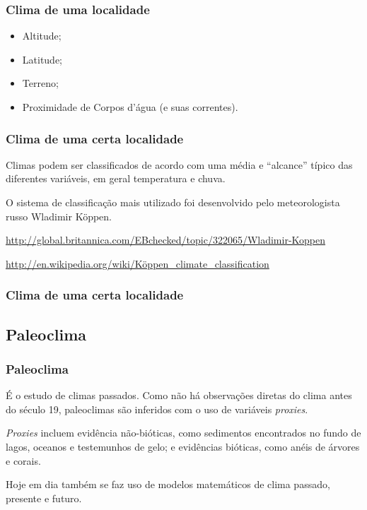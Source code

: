 \begin{frame}
\frametitle{Clima de uma localidade}
  \begin{itemize}[<+-| alert@+>]
    \item Altitude;
    \item Latitude;
    \item Terreno;
    \item Proximidade de Corpos d'água (e suas correntes).
  \end{itemize}
\end{frame}

\begin{frame}
\frametitle{Clima de uma certa localidade}
  \begin{block}{}
    Climas podem ser classificados de acordo com uma média e ``alcance'' típico
    das diferentes variáveis, em geral temperatura e chuva.
  \end{block}
\pause
  \begin{block}{}
    O sistema de classificação mais utilizado foi desenvolvido pelo
    meteorologista russo Wladimir Köppen.
  \end{block}
\pause
{\scriptsize
\url{http://global.britannica.com/EBchecked/topic/322065/Wladimir-Koppen}

\href{http://en.wikipedia.org/wiki/K\%C3\%B6ppen_climate_classification}{http://en.wikipedia.org/wiki/Köppen\_climate\_classification}
}
\end{frame}

\begin{frame}
\frametitle{Clima de uma certa localidade}
  \begin{center}
  \end{center}
\end{frame}

\subsection{Paleoclima}
\begin{frame}
\frametitle{Paleoclima}
  \begin{block}{}
    É o estudo de climas passados.  Como não há observações diretas do clima
    antes do século 19, paleoclimas são inferidos com o uso de variáveis
    {\it proxies}.
  \end{block}
  \pause
  \begin{block}{}
    {\it Proxies} incluem evidência não-bióticas, como sedimentos
    encontrados no fundo de lagos, oceanos e testemunhos de gelo; e evidências
    bióticas, como anéis de árvores e corais.
  \end{block}
  \pause
  \begin{block}{}
    Hoje em dia também se faz uso de modelos matemáticos de clima passado,
    presente e futuro.
  \end{block}
\end{frame}

